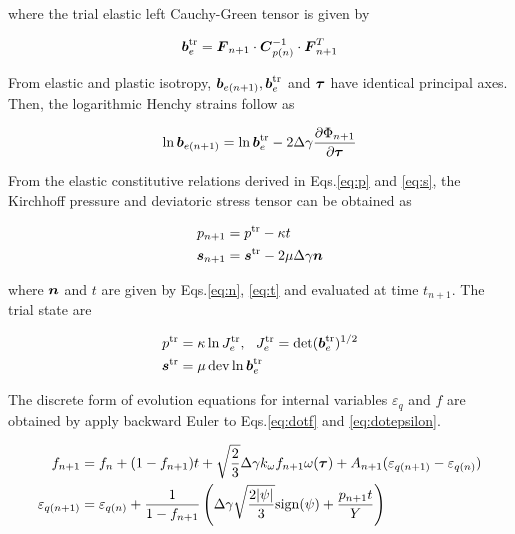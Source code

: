 where the trial elastic left Cauchy-Green tensor is given by

\begin{equation}\label{eq:betr}
{\boldsymbol{b}}_e^{\operatorname{\text{tr}}} = {\boldsymbol{F}}_{n+1}\cdot{\boldsymbol{C}}_{p(n)}^{-1}\cdot{\boldsymbol{F}}^T_{n+1}
\end{equation}

From elastic and plastic isotropy, ${\boldsymbol{b}}_{e(n+1)}, {\boldsymbol{b}}_e^{\operatorname{\text{tr}}}$ and ${\boldsymbol{\tau}}$ have identical principal axes. Then, the logarithmic Henchy strains follow as

\begin{equation}\label{eq:lnbetr}
\ln{\boldsymbol{b}}_{e(n+1)} = \ln{\boldsymbol{b}}_e^{\operatorname{\text{tr}}} - 2\Delta\gamma\frac{\partial\Phi_{n+1}}{\partial{\boldsymbol{\tau}}}
\end{equation}

From the elastic constitutive relations derived in Eqs.\eqref{eq:p} and \eqref{eq:s}, the Kirchhoff pressure and deviatoric stress tensor can be obtained as

\begin{align}
p_{n+1} &= p^{\operatorname{\text{tr}}} - \kappa t\label{eq:discrete_p}\\
{\boldsymbol{s}}_{n+1} &= {\boldsymbol{s}}^{\operatorname{\text{tr}}} - 2\mu\Delta\gamma {\boldsymbol{n}}\label{eq:discrete_s}
\end{align}

where ${\boldsymbol{n}}$ and $t$ are given by Eqs.\eqref{eq:n}, \eqref{eq:t} and evaluated at time $t_{n+1}$. The trial state are

\begin{align}
p^{\operatorname{\text{tr}}} &= \kappa\ln J_e^{\operatorname{\text{tr}}},~~J_e^{\operatorname{\text{tr}}} = \det({\boldsymbol{b}}_e^{\operatorname{\text{tr}}})^{1/2}\label{eq:ptr}\\
{\boldsymbol{s}}^{\operatorname{\text{tr}}}&= \mu\operatorname{\text{dev}}\ln{\boldsymbol{b}}_e^{\operatorname{\text{tr}}}\label{eq:str}
\end{align}

The discrete form of evolution equations for internal variables $\varepsilon_q$ and $f$ are obtained by apply backward Euler to Eqs.\eqref{eq:dotf} and \eqref{eq:dotepsilon}. 

\begin{align}
f_{n+1} &= f_n + (1-f_{n+1})t + \sqrt{\frac{2}{3}}\Delta\gamma  k_{\omega}f_{n+1} \omega({\boldsymbol{\tau}}) + A_{n+1}(\varepsilon_{q(n+1)} - \varepsilon_{q(n)})\label{eq:discrete_f}\\
\varepsilon_{q(n+1)} &= \varepsilon_{q(n)} + \frac{1}{1-f_{n+1}}\left(\Delta\gamma\sqrt{\frac{2|\psi|}{3}} {\rm sign}(\psi) + \frac{p_{n+1} t}{Y}\right)\label{eq:discrete_eq}
\end{align}

